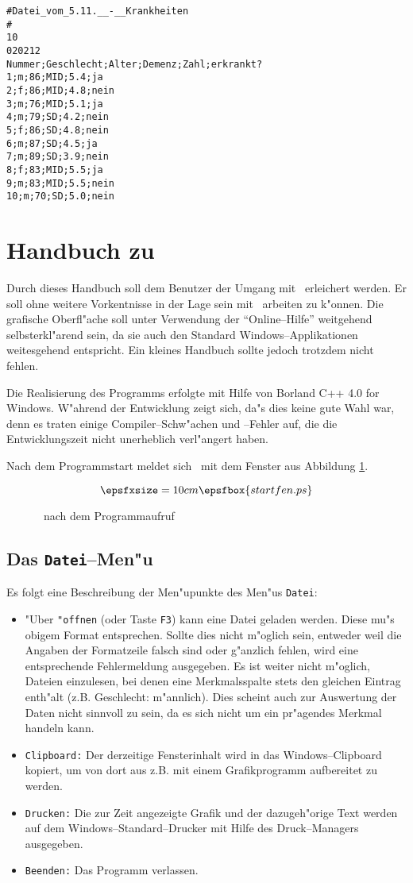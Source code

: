 \begin{verbatim}
#Datei_vom_5.11.__-__Krankheiten
#
10
020212
Nummer;Geschlecht;Alter;Demenz;Zahl;erkrankt?
1;m;86;MID;5.4;ja
2;f;86;MID;4.8;nein
3;m;76;MID;5.1;ja
4;m;79;SD;4.2;nein
5;f;86;SD;4.8;nein
6;m;87;SD;4.5;ja
7;m;89;SD;3.9;nein
8;f;83;MID;5.5;ja
9;m;83;MID;5.5;nein
10;m;70;SD;5.0;nein
\end{verbatim}

\section{Handbuch zu  \Clustering}
\label{handbuch}
Durch dieses Handbuch soll dem Benutzer der Umgang mit \Clustering\
erleichert werden. Er soll ohne weitere Vorkentnisse in der Lage sein
mit \Clustering\ arbeiten zu k"onnen. Die grafische Oberfl"ache soll 
unter Verwendung der "`Online--Hilfe"' weitgehend selbsterkl"arend sein,
da sie auch den Standard Windows--Applikationen weitesgehend 
entspricht. Ein kleines Handbuch sollte jedoch trotzdem nicht fehlen.

Die Realisierung des Programms erfolgte mit Hilfe von {\sc Borland} C++ 4.0
for Windows.
W"ahrend der Entwicklung zeigt sich, da"s dies keine gute Wahl war, denn
es traten einige Compiler--Schw"achen und --Fehler auf, die die
Entwicklungszeit nicht unerheblich verl"angert haben.

Nach dem Programmstart meldet sich
\Clustering\ mit dem Fenster aus Abbildung \ref{startfenster}.

\begin{figure}[ht]
	\[ \epsfxsize=10cm \epsfbox{startfen.ps} \]
	\caption{\Clustering\ nach dem Programmaufruf 
	\label{startfenster}}
\end{figure}

\subsection*{Das {\tt Datei}--Men"u}
Es folgt eine Beschreibung der Men"upunkte des Men"us {\tt Datei}:
\begin{itemize}
\item "Uber {\tt "offnen} (oder Taste {\tt F3})  kann eine Datei
	geladen werden. Diese mu"s obigem Format entsprechen.
	 Sollte dies nicht m"oglich sein, entweder weil die Angaben
	der Formatzeile falsch sind oder g"anzlich fehlen, wird eine
	entsprechende Fehlermeldung ausgegeben.
	Es ist weiter nicht m"oglich, Dateien einzulesen, bei denen eine
	Merkmalsspalte stets den gleichen Eintrag enth"alt (z.B.
	Geschlecht: m"annlich). Dies scheint auch zur Auswertung der Daten
	nicht sinnvoll zu sein, da es sich nicht um ein pr"agendes 
	Merkmal handeln kann.
\item {\tt Clipboard:} Der derzeitige Fensterinhalt wird in das
	Windows--Clipboard kopiert, um von dort aus z.B. mit einem Grafikprogramm
	aufbereitet zu werden.
\item {\tt Drucken:} Die zur Zeit angezeigte Grafik und der dazugeh"orige Text 
	werden auf dem Windows--Standard--Drucker mit Hilfe des 
	Druck--Managers ausgegeben.
\item {\tt Beenden:} Das Programm verlassen.
\end{itemize}

